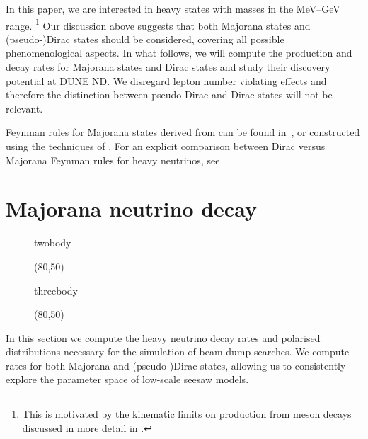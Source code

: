 In this paper, we are interested in heavy states with masses in the MeV--GeV range.%
\footnote{This is motivated by the kinematic limits on production from meson decays discussed in more detail in .} %
Our discussion above suggests that both Majorana states and (pseudo-)Dirac states should be considered, %
covering all possible phenomenological aspects.
In what follows, we will compute the production and decay rates for Majorana states %
and Dirac states and study their discovery potential at DUNE ND.
We disregard lepton number violating effects and therefore the distinction between pseudo-Dirac and Dirac states will not be relevant.

Feynman rules for Majorana states derived from  can be found in~\cite{Atre:2009rg},
or constructed using the techniques of . 
For an explicit comparison between Dirac versus Majorana Feynman rules for heavy neutrinos, see~.

\section{Majorana neutrino decay}
\label{sec:decay}


\begin{figure}
	\centering
	\begin{fmffile}{twobody}
		\begin{fmfgraph*}(80,50)
		\end{fmfgraph*}
	\end{fmffile}
	\hfill
	\begin{fmffile}{threebody}
		\begin{fmfgraph*}(80,50)
		\end{fmfgraph*}
	\end{fmffile}
\end{figure}

In this section we compute the heavy neutrino decay rates and polarised %
distributions necessary for the simulation of beam dump searches.
We compute rates for both Majorana and (pseudo-)Dirac states, allowing us to consistently %
explore the parameter space of low-scale seesaw models.
%

